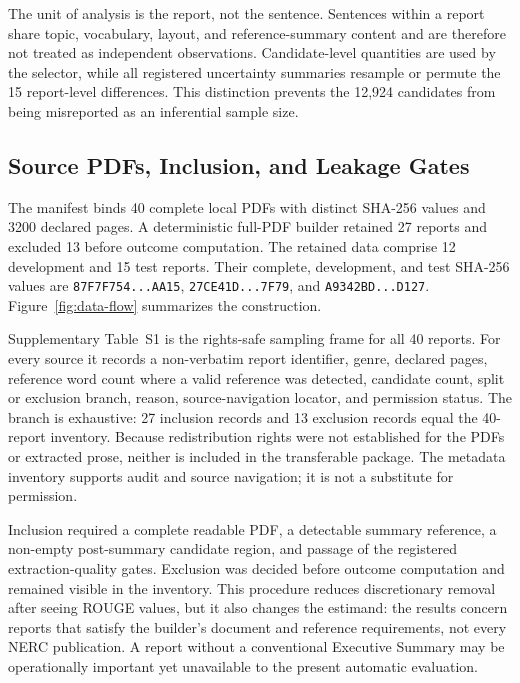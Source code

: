 \documentclass[applsci,article,submit,moreauthors]{Definitions/mdpi}
\begin{document}
The unit of analysis is the report, not the sentence. Sentences within a report share topic, vocabulary, layout, and reference-summary content and are therefore not treated as independent observations. Candidate-level quantities are used by the selector, while all registered uncertainty summaries resample or permute the 15 report-level differences. This distinction prevents the 12,924 candidates from being misreported as an inferential sample size.

\subsection{Source PDFs, Inclusion, and Leakage Gates}

The manifest binds 40 complete local PDFs with distinct SHA-256 values and 3200 declared pages. A deterministic full-PDF builder retained 27 reports and excluded 13 before outcome computation. The retained data comprise 12 development and 15 test reports. Their complete, development, and test SHA-256 values are \texttt{87F7F754...AA15}, \texttt{27CE41D...7F79}, and \texttt{A9342BD...D127}. Figure~\ref{fig:data-flow} summarizes the construction.

Supplementary Table~S1 is the rights-safe sampling frame for all 40 reports. For every source it records a non-verbatim report identifier, genre, declared pages, reference word count where a valid reference was detected, candidate count, split or exclusion branch, reason, source-navigation locator, and permission status. The branch is exhaustive: 27 inclusion records and 13 exclusion records equal the 40-report inventory. Because redistribution rights were not established for the PDFs or extracted prose, neither is included in the transferable package. The metadata inventory supports audit and source navigation; it is not a substitute for permission.

Inclusion required a complete readable PDF, a detectable summary reference, a non-empty post-summary candidate region, and passage of the registered extraction-quality gates. Exclusion was decided before outcome computation and remained visible in the inventory. This procedure reduces discretionary removal after seeing ROUGE values, but it also changes the estimand: the results concern reports that satisfy the builder's document and reference requirements, not every NERC publication. A report without a conventional Executive Summary may be operationally important yet unavailable to the present automatic evaluation.
\end{document}
